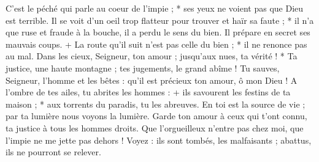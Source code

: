 C'est le péché qui parle au coeur de l'impie ; * ses yeux ne voient pas que Dieu est terrible.
\versseparator
Il se voit d'un oeil trop flatteur pour trouver et haïr sa faute ; *
\versseparator
il n'a que ruse et fraude à la bouche, il a perdu le sens du bien.
\versseparator
Il prépare en secret ses mauvais coups. + La route qu'il suit n'est pas celle du bien ; * il ne renonce pas au mal.
\versseparator
Dans les cieux, Seigneur, ton amour ; jusqu'aux nues, ta vérité ! *
\versseparator
Ta justice, une haute montagne ; tes jugements, le grand abîme ! Tu sauves, Seigneur, l'homme et les bêtes :
\versseparator
qu'il est précieux ton amour, ô mon Dieu ! A l'ombre de tes ailes, tu abrites les hommes : +
\versseparator
ils savourent les festins de ta maison ; * aux torrents du paradis, tu les abreuves.
\versseparator
En toi est la source de vie ; par ta lumière nous voyons la lumière.
\versseparator
Garde ton amour à ceux qui t'ont connu, ta justice à tous les hommes droits.
\versseparator
Que l'orgueilleux n'entre pas chez moi, que l'impie ne me jette pas dehors !
\versseparator
Voyez : ils sont tombés, les malfaisants ; abattus, ils ne pourront se relever.

